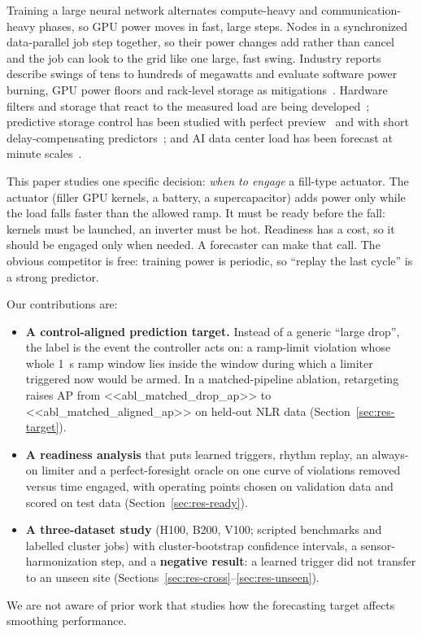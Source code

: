 \documentclass[11pt]{article}
\begin{document}
Training a large neural network alternates compute-heavy and communication-heavy phases, so GPU power
moves in fast, large steps. Nodes in a synchronized data-parallel job step together, so their power
changes add rather than cancel and the job can look to the grid like one large, fast swing. Industry reports describe swings of tens to hundreds of megawatts and
evaluate software power burning, GPU power floors and rack-level storage as mitigations~\cite{msft_stab}.
Hardware filters and storage that react to the measured load are being developed~\cite{easyrider,
activefilter}; predictive storage control has been studied with perfect preview~\cite{hess} and with
short delay-compensating predictors~\cite{delaycomp}; and AI data center load has been forecast at minute
scales~\cite{stlf}.

This paper studies one specific decision: \emph{when to engage} a fill-type actuator. The actuator (filler
GPU kernels, a battery, a supercapacitor) adds power only while the load falls faster than the allowed
ramp. It must be ready before the fall: kernels must be launched, an inverter must be hot. Readiness has a
cost, so it should be engaged only when needed. A forecaster can make that call. The obvious competitor is
free: training power is periodic, so ``replay the last cycle'' is a strong predictor.

Our contributions are:
\begin{itemize}
\item \textbf{A control-aligned prediction target.} Instead of a generic ``large drop'', the label is the
event the controller acts on: a ramp-limit violation whose whole 1~s ramp window lies inside the window
during which a limiter triggered now would be armed. In a matched-pipeline ablation, retargeting raises AP from <<abl_matched_drop_ap>> to <<abl_matched_aligned_ap>> on held-out NLR
data (Section~\ref{sec:res-target}).
\item \textbf{A readiness analysis} that puts learned triggers, rhythm replay, an always-on limiter and a
perfect-foresight oracle on one curve of violations removed versus time engaged, with operating points
chosen on validation data and scored on test data (Section~\ref{sec:res-ready}).
\item \textbf{A three-dataset study} (H100, B200, V100; scripted benchmarks and labelled cluster jobs) with
cluster-bootstrap confidence intervals, a sensor-harmonization step, and a \textbf{negative result}: a
learned trigger did not transfer to an unseen site (Sections~\ref{sec:res-cross}--\ref{sec:res-unseen}).
\end{itemize}
We are not aware of prior work that studies how the forecasting target affects smoothing performance.
\end{document}
